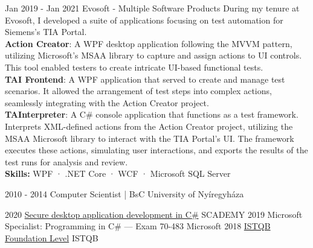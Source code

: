 \documentclass[9pt]{developercv}
\begin{document}
\begin{entrylist}
	\entry
		{Jan 2019 - Jan 2021}
		{Evosoft - Multiple Software Products}
		{}
		{During my tenure at Evosoft, I developed a suite of applications focusing on test automation for Siemens's TIA Portal. \\

\textbf{Action Creator}: A WPF desktop application following the MVVM pattern, utilizing Microsoft's MSAA library to capture and assign actions to UI controls. This tool enabled testers to create intricate UI-based functional tests. \\

\textbf{TAI Frontend}: A WPF application that served to create and manage test scenarios. It allowed the arrangement of test steps into complex actions, seamlessly integrating with the Action Creator project. \\

\textbf{TAInterpreter}: A C\# console application that functions as a test framework. Interprets XML-defined actions from the Action Creator project, utilizing the MSAA Microsoft library to interact with the TIA Portal's UI. The framework executes these actions, simulating user interactions, and exports the results of the test runs for analysis and review. \\

 \textbf{Skills:} WPF · .NET Core · WCF · Microsoft SQL Server }
 
\end{entrylist}

\pagebreak
{}

\begin{entrylist}
	\entry
		{2010 - 2014}
		{Computer Scientist | BsC}
		{University of Nyíregyháza}
		
\end{entrylist}


\begin{entrylist}
    \entry
        {2020}
        {\href{https://www.scademy.com/courses/cl-ans}{Secure desktop application development in C\#}}
        {SCADEMY}
        {}
    \entry
        {2019}
        {Microsoft Specialist: Programming in C\# — Exam 70-483}
        {Microsoft}
        {}
    \entry
        {2018}
        {\href{https://astqb.org/certifications/foundation-level-certification/}{ISTQB Foundation Level}}
        {ISTQB}
        {}
\end{entrylist}
	
\end{document}
